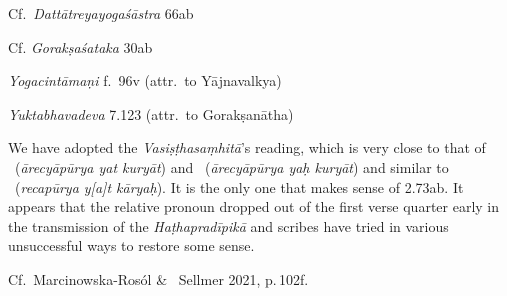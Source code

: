 \begin{ekdosis}
\begin{sources}[hp02_073]
Cf.~\emph{Dattātreyayogaśāstra} 66ab

\begin{versinnote}
\end{versinnote}

Cf. \emph{Gorakṣaśataka} 30ab

\begin{versinnote}
\end{versinnote}


\end{sources}

\begin{testimonia}[hp02_073]
\emph{Yogacintāmaṇi} f.~96v (attr.~to Yājnavalkya)
\begin{versinnote}
\end{versinnote}

\emph{Yuktabhavadeva} 7.123 (attr.~to Gorakṣanātha)

\begin{versinnote}
\end{versinnote}
\end{testimonia}

\begin{philcomm}[hp02_073]
We have adopted the \emph{Vasiṣṭhasaṃhitā}’s reading, which is very close to that of \deltaOne \ (\emph{ārecyāpūrya yat kuryāt}) and \deltaThree \ (\emph{ārecyāpūrya yaḥ kuryāt}) and similar to \alphaTwo\ (\emph{recapūrya y\emph{[}a\emph{]}t kāryaḥ}). It is the only one that makes sense of 2.73ab. It appears that the relative pronoun dropped out of the first verse quarter early in the transmission of the \emph{Haṭhapradīpikā} and scribes have tried in various unsuccessful ways to restore some sense. 

Cf.~Marcinowska-Rosól \& \ Sellmer 2021, p.\,102f.

\end{philcomm}




\end{ekdosis}
